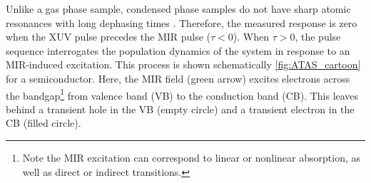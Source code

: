 

Unlike a gas phase sample, condensed phase samples do not have sharp atomic resonances with long dephasing times \cite{ramaseshaRealTimeProbingElectron2016}. Therefore, the measured response is zero when the XUV pulse precedes the MIR pulse ($\tau<0$). When $\tau>0$, the pulse sequence interrogates the population dynamics of the system in response to an MIR-induced excitation. This process is shown schematically \cref{fig:ATAS_cartoon} for a semiconductor. Here, the MIR field (green arrow) excites electrons across the bandgap\footnote{Note the MIR excitation can correspond to linear or nonlinear absorption, as well as direct or indirect transitions.} from valence band (VB) to the conduction band (CB). This leaves behind a transient hole in the VB (empty circle) and a transient electron in the CB (filled circle). 

